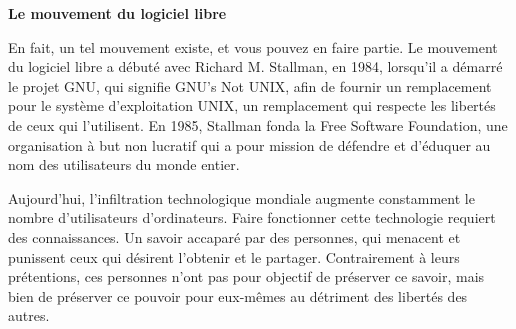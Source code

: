\documentclass[12pt]{article}
\begin{document}
\begin{center}
{\Large\bf Le mouvement du logiciel libre}
\end{center}

En fait, un tel mouvement existe, et vous pouvez en faire partie. Le mouvement
du logiciel libre a débuté avec Richard M. Stallman, en 1984, lorsqu'il a
démarré le projet GNU, qui signifie \guillemotleft{} GNU's Not
UNIX\guillemotright, afin de fournir un remplacement pour le système
d'exploitation UNIX, un remplacement qui respecte les libertés de ceux qui
l'utilisent. En 1985, Stallman fonda la Free Software Foundation, une
organisation à but non lucratif qui a pour mission de défendre et d'éduquer au
nom des utilisateurs du monde entier.


Aujourd'hui, l'infiltration technologique mondiale augmente constamment le
nombre d'utilisateurs d'ordinateurs. Faire fonctionner cette technologie
requiert des connaissances. Un savoir accaparé par des personnes, qui menacent
et punissent ceux qui désirent l'obtenir et le partager. Contrairement à leurs
prétentions, ces personnes n'ont pas pour objectif de préserver ce savoir, mais
bien de préserver ce pouvoir pour eux-mêmes au détriment des libertés des
autres.

\end{document}
